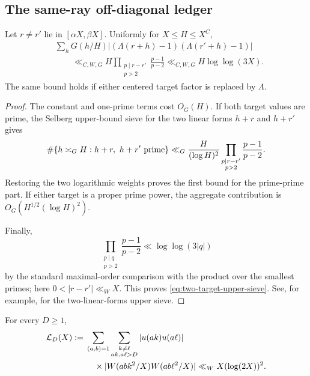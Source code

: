 \subsection{The same-ray off-diagonal ledger}

\begin{lemma}
\label{lem:two-target-upper-sieve}
Let $r\ne r'$ lie in $[\alpha X,\beta X]$.  Uniformly for
$X\leq H\leq X^C$,
\begin{equation}
 \begin{aligned}
 &\sum_hG(h/H)
 \left|(\Lambda(r+h)-1)(\Lambda(r'+h)-1)\right|\\
 &\qquad\ll_{C,W,G}
 H\prod_{\substack{p\mid r-r'\\p>2}}\frac{p-1}{p-2}
 \ll_{C,W,G}H\log\log(3X).
 \end{aligned}
 \label{eq:two-target-upper-sieve}
\end{equation}
The same bound holds if either centered target factor is replaced by
$\Lambda$.
\end{lemma}

\begin{proof}
The constant and one-prime terms cost $O_G(H)$.  If both target values are
prime, the Selberg upper-bound sieve for the two linear forms $h+r$ and
$h+r'$ gives
\[
 \#\{h\asymp_G H:h+r,\ h+r'\ \hbox{prime}\}
 \ll_G\frac{H}{(\log H)^2}
 \prod_{\substack{p\mid r-r'\\p>2}}\frac{p-1}{p-2}.
\]
Restoring the two logarithmic weights proves the first bound for the
prime-prime part.  If either target is a proper prime power, the aggregate
contribution is $O_G(H^{1/2}(\log H)^2)$.

Finally,
\[
 \prod_{\substack{p\mid q\\p>2}}\frac{p-1}{p-2}
 \ll\log\log(3|q|)
\]
by the standard maximal-order comparison with the product over the
smallest primes; here $0<|r-r'|\ll_W X$.  This proves
\eqref{eq:two-target-upper-sieve}.  See, for example,
\citet[Chapter~6]{HalberstamRichert1974} for the two-linear-forms upper
sieve.
\end{proof}

\begin{lemma}
\label{lem:same-ray-source-ledger}
For every $D\geq1$,
\begin{equation}
 \begin{aligned}
 \mathcal L_D(X):={}&
 \sum_{\substack{(a,b)=1}}
 \sum_{\substack{k\ne\ell\\ak,a\ell>D}}
 |u(ak)u(a\ell)|\\
 &\quad\times
 |W(abk^2/X)W(ab\ell^2/X)|
 \ll_W X(\log(2X))^2.
 \end{aligned}
 \label{eq:same-ray-source-ledger}
\end{equation}
\end{lemma}

